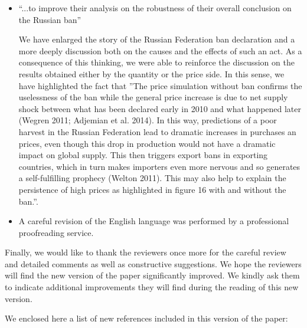 \documentclass[a4paper,12pt]{article}
\begin{document}
\begin{itemize}
    \item ``...to improve their analysis on the robustness of their overall conclusion on the Russian ban''
    
    We have enlarged the story of the Russian Federation ban declaration and a more deeply discussion both on the causes and the effects of such an act. As a consequence of this thinking, we were able to reinforce the discussion on the results obtained either by the quantity or the price side. In this sense, we have highlighted the fact that  ''The price simulation without ban confirms the uselessness of the ban while the general price increase is due to net supply shock between what has been declared early in 2010 and what happened later (Wegren 2011; Adjemian et al. 2014). In this way, predictions of a poor harvest in the Russian Federation lead to dramatic increases in purchases an prices, even though this drop in production would not have a dramatic impact on global supply. This then triggers export bans in exporting countries, which in turn makes importers even more nervous and so generates a self-fulfilling prophecy (Welton 2011). This may also help to explain the persistence of high prices as highlighted in figure 16 with and without the ban.''. 

\item A careful revision of the English language was performed by a professional proofreading service.
	
\end{itemize}


\vskip1cm
Finally, we would like to thank the reviewers once more for the careful review and detailed comments as well as constructive suggestions. We hope the reviewers will find the new version of the paper significantly improved. We kindly ask them to indicate additional improvements they will find during the reading of this new version. 

\vskip1cm
We enclosed here a list of new references included in this version of the paper:
\end{document}
